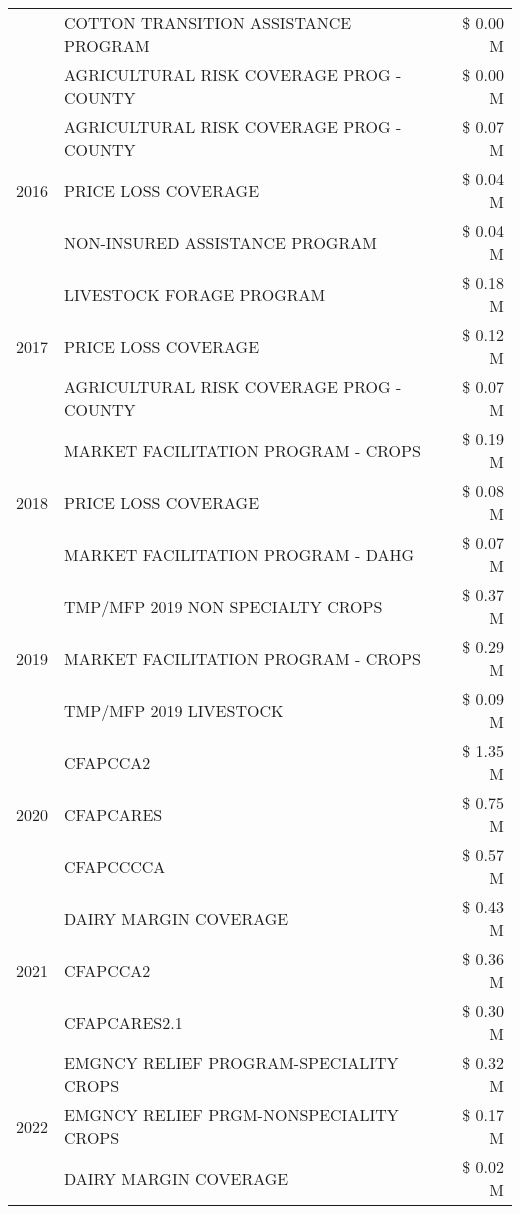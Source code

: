 \begin{tabular}{llr}
 & COTTON TRANSITION ASSISTANCE PROGRAM & \$ 0.00 M \\
 & AGRICULTURAL RISK COVERAGE PROG - COUNTY & \$ 0.00 M \\
\cline{1-3}
\multirow[t]{3}{*}{2016} & AGRICULTURAL RISK COVERAGE PROG - COUNTY & \$ 0.07 M \\
 & PRICE LOSS COVERAGE & \$ 0.04 M \\
 & NON-INSURED ASSISTANCE PROGRAM & \$ 0.04 M \\
\cline{1-3}
\multirow[t]{3}{*}{2017} & LIVESTOCK FORAGE PROGRAM & \$ 0.18 M \\
 & PRICE LOSS COVERAGE & \$ 0.12 M \\
 & AGRICULTURAL RISK COVERAGE PROG - COUNTY & \$ 0.07 M \\
\cline{1-3}
\multirow[t]{3}{*}{2018} & MARKET FACILITATION PROGRAM - CROPS & \$ 0.19 M \\
 & PRICE LOSS COVERAGE & \$ 0.08 M \\
 & MARKET FACILITATION PROGRAM - DAHG & \$ 0.07 M \\
\cline{1-3}
\multirow[t]{3}{*}{2019} & TMP/MFP 2019 NON SPECIALTY CROPS & \$ 0.37 M \\
 & MARKET FACILITATION PROGRAM - CROPS & \$ 0.29 M \\
 & TMP/MFP 2019 LIVESTOCK & \$ 0.09 M \\
\cline{1-3}
\multirow[t]{3}{*}{2020} & CFAPCCA2 & \$ 1.35 M \\
 & CFAPCARES & \$ 0.75 M \\
 & CFAPCCCCA & \$ 0.57 M \\
\cline{1-3}
\multirow[t]{3}{*}{2021} & DAIRY MARGIN COVERAGE & \$ 0.43 M \\
 & CFAPCCA2 & \$ 0.36 M \\
 & CFAPCARES2.1 & \$ 0.30 M \\
\cline{1-3}
\multirow[t]{3}{*}{2022} & EMGNCY RELIEF PROGRAM-SPECIALITY CROPS & \$ 0.32 M \\
 & EMGNCY RELIEF PRGM-NONSPECIALITY CROPS & \$ 0.17 M \\
 & DAIRY MARGIN COVERAGE & \$ 0.02 M \\
\cline{1-3}
\bottomrule
\end{tabular}
